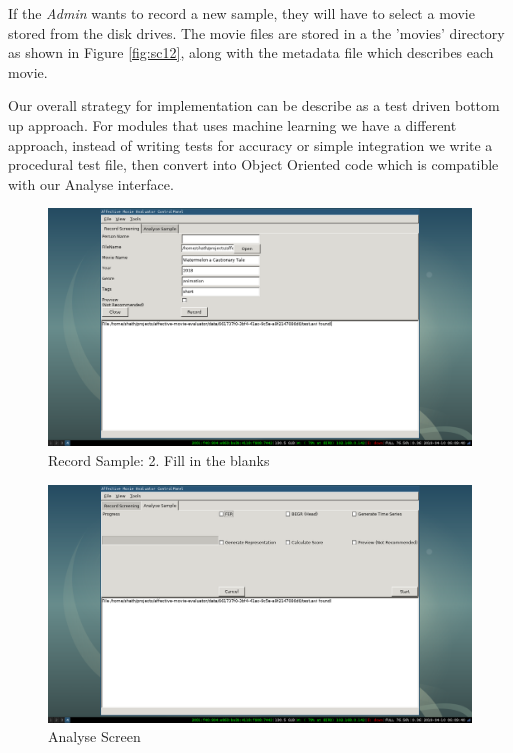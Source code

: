 \documentclass[12pt,a4paper,man]{report}
\begin{document}
If the \emph{Admin} wants to record a new sample, they will have to select a movie stored from the disk drives. The movie files are stored in a the 'movies' directory as shown in Figure \ref{fig:sc12}, along with the metadata file which describes each movie.

Our overall strategy for implementation can be describe as a test driven bottom up approach. For modules that uses machine learning we have a different approach, instead of writing tests for accuracy or simple integration we write a procedural test file, then convert into Object Oriented code which is compatible with our Analyse interface.


\begin{figure}[htbp]
\centering
\includegraphics[width=5in]{./ext_img/sc2.png}
\caption{\label{fig:sc2}
Record Sample: 2. Fill in the blanks}
\end{figure}



\begin{figure}[htbp]
\centering
\includegraphics[width=5in]{./ext_img/sc3.png}
\caption{\label{fig:sc3}
Analyse Screen}
\end{figure}
\end{document}
